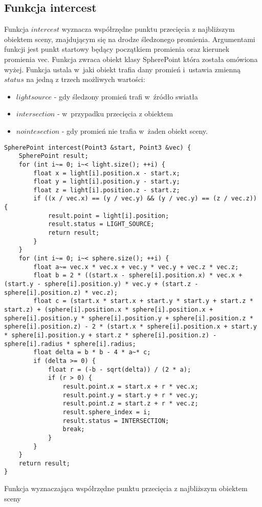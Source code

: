 \documentclass[11pt,a4paper,titlepage]{article}
\newenvironment{longlisting}{\captionsetup{type=listing}}{}
\begin{document}
\subsection{Funkcja intercest}
Funkcja $intercest$ wyznacza współrzędne punktu przecięcia z najbliższym obiektem sceny, znajdującym się na drodze śledzonego promienia. Argumentami funkcji jest punkt startowy będący początkiem promienia oraz kierunek promienia vec.
Funkcja zwraca obiekt klasy SpherePoint która została omówiona wyżej. Funkcja ustala w~jaki obiekt trafia dany promień i~ustawia zmienną $status$ na jedną z trzech możliwych wartości:	\begin{itemize}
    \item $lightsource$ - gdy śledzony promień trafi w~źródło swiatła
    \item $intersection$ - w~przypadku przecięcia z obiektem
    \item $nointesection$ - gdy promień nie trafia w~żaden obiekt sceny.
\end{itemize}
\begin{longlisting}
\begin{verbatim}
SpherePoint intercest(Point3 &start, Point3 &vec) {
	SpherePoint result;
	for (int i~= 0; i~< light.size(); ++i) {
		float x = light[i].position.x - start.x;
		float y = light[i].position.y - start.y;
		float z = light[i].position.z - start.z;
		if ((x / vec.x) == (y / vec.y) && (y / vec.y) == (z / vec.z)) {
			result.point = light[i].position;
			result.status = LIGHT_SOURCE;
			return result;
		}
	}
	for (int i~= 0; i~< sphere.size(); ++i) {
		float a~= vec.x * vec.x + vec.y * vec.y + vec.z * vec.z;
		float b = 2 * ((start.x - sphere[i].position.x) * vec.x + (start.y - sphere[i].position.y) * vec.y + (start.z - sphere[i].position.z) * vec.z);
		float c = (start.x * start.x + start.y * start.y + start.z * start.z) + (sphere[i].position.x * sphere[i].position.x + sphere[i].position.y * sphere[i].position.y + sphere[i].position.z * sphere[i].position.z) - 2 * (start.x * sphere[i].position.x + start.y * sphere[i].position.y + start.z * sphere[i].position.z) - sphere[i].radius * sphere[i].radius;
		float delta = b * b - 4 * a~* c;
		if (delta >= 0) {
			float r = (-b - sqrt(delta)) / (2 * a);
			if (r > 0) {
				result.point.x = start.x + r * vec.x;
				result.point.y = start.y + r * vec.y;
				result.point.z = start.z + r * vec.z;
				result.sphere_index = i;
				result.status = INTERSECTION;
				break;
			}
		}
	}
	return result;
}
\end{verbatim}
\caption{Funkcja wyznaczająca współrzędne punktu przecięcia z najbliższym obiektem sceny}
\end{longlisting}
\end{document}
